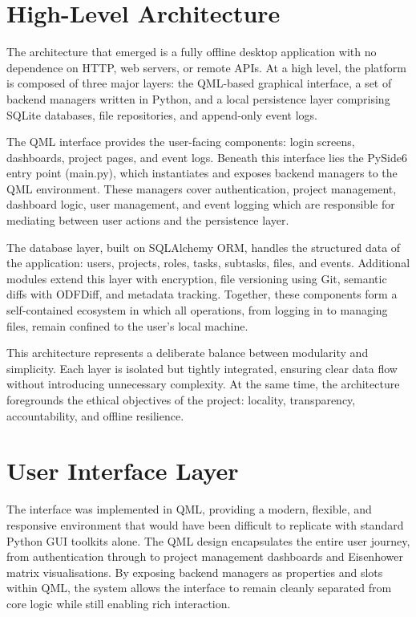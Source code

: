\documentclass{report}
\begin{document}
\section{High-Level Architecture}

The architecture that emerged is a fully offline desktop application with no dependence on HTTP, web servers, or remote APIs. 
At a high level, the platform is composed of three major layers: the QML-based graphical interface, a set of backend managers written in Python, and a local persistence layer comprising SQLite databases, file repositories, and append-only event logs.

The QML interface provides the user-facing components: login screens, dashboards, project pages, and event logs. 
Beneath this interface lies the PySide6 entry point (main.py), which instantiates and exposes backend managers to the QML environment. 
These managers cover authentication, project management, dashboard logic, user management, and event logging which are responsible for mediating between user actions and the persistence layer.

The database layer, built on SQLAlchemy ORM, handles the structured data of the application: users, projects, roles, tasks, subtasks, files, and events. 
Additional modules extend this layer with encryption, file versioning using Git, semantic diffs with ODFDiff, and metadata tracking. 
Together, these components form a self-contained ecosystem in which all operations, from logging in to managing files, remain confined to the user's local machine.

This architecture represents a deliberate balance between modularity and simplicity. 
Each layer is isolated but tightly integrated, ensuring clear data flow without introducing unnecessary complexity. 
At the same time, the architecture foregrounds the ethical objectives of the project: locality, transparency, accountability, and offline resilience.

\section{User Interface Layer}

The interface was implemented in QML, providing a modern, flexible, and responsive environment that would have been difficult to replicate with standard Python GUI toolkits alone. 
The QML design encapsulates the entire user journey, from authentication through to project management dashboards and Eisenhower matrix visualisations. 
By exposing backend managers as properties and slots within QML, the system allows the interface to remain cleanly separated from core logic while still enabling rich interaction.
\end{document}
